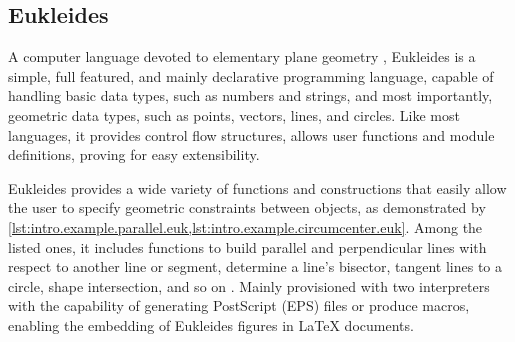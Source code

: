 \subsection{Eukleides}
\label{sec:related.constraints.eukleides}

A computer language devoted to elementary plane geometry \cite{Obrecht:2010:EM},
Eukleides is a simple, full featured, and mainly declarative programming
language, capable of handling basic data types, such as numbers and strings, and
most importantly, geometric data types, such as points, vectors, lines, and
circles.  Like most languages, it provides control flow structures, allows user
functions and module definitions, proving for easy extensibility.

Eukleides provides a wide variety of functions and constructions that easily
allow the user to specify geometric constraints between objects, as demonstrated
by \cref{lst:intro.example.parallel.euk,lst:intro.example.circumcenter.euk}.
Among the listed ones, it includes functions to build parallel and perpendicular
lines with respect to another line or segment, determine a line's bisector,
tangent lines to a circle, shape intersection, and so on \cite{Obrecht:2010:EM}.
Mainly provisioned with two interpreters with the capability of generating
PostScript (EPS) files or produce macros, enabling the embedding of Eukleides
figures in \LaTeX{} documents.

